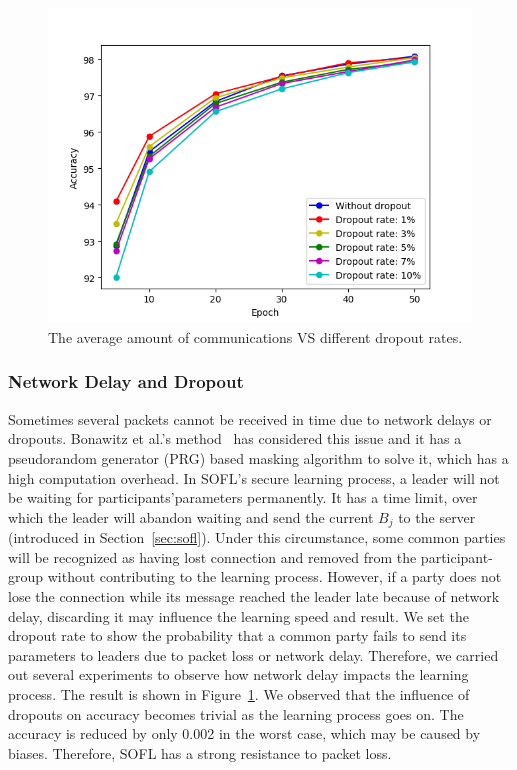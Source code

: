 \begin{figure}[!ht]
    \centering
    \includegraphics[width=\columnwidth]{img/dropout-acc.png}
    \caption{The average amount of communications VS different dropout rates.}
    \label{dropout-acc}
\end{figure}

\subsubsection{Network Delay and Dropout}
Sometimes several packets cannot be received in time due to network delays or dropouts. Bonawitz et al.'s method~\cite{Practical} has considered this issue and it has a pseudorandom generator (PRG) based masking algorithm to solve it, which has a high computation overhead. In SOFL's secure learning process, a leader will not be waiting for participants'parameters permanently. It has a time limit, over which the leader will abandon waiting and send the current $B_j$ to the server (introduced in Section~\ref{sec:sofl}). Under this circumstance, some common parties will be recognized as having lost connection and removed from the participant-group without contributing to the learning process. However, if a party does not lose the connection while its message reached the leader late because of network delay, discarding it may influence the learning speed and result. We set the dropout rate to show the probability that a common party fails to send its parameters to leaders due to packet loss or network delay. Therefore, we carried out several experiments to observe how network delay impacts the learning process. The result is shown in Figure~\ref{dropout-acc}. We observed that the influence of dropouts on accuracy becomes trivial as the learning process goes on. The accuracy is reduced by only 0.002 in the worst case, which may be caused by biases. Therefore, SOFL has a strong resistance to packet loss. 